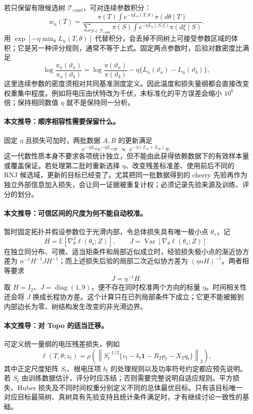 若只保留有限候选树 $\mathcal T_{\mathrm{cand}}$，可对连续参数积分：
\[
 w_n(T)=
 \frac{\pi(T)\int e^{-\eta L_n(T,\theta)}\pi(d\theta\mid T)}
 {\sum_{S\in\mathcal T_{\mathrm{cand}}}\pi(S)
       \int e^{-\eta L_n(S,\xi)}\pi(d\xi\mid S)}.
\]
用 $\exp[-\eta\min_\theta L_n(T,\theta)]$ 代替积分，会丢掉不同树上可接受参数区域的体积；它是另一种评分规则，通常不等于上式。固定两点参数时，后验对数密度比满足
\[
 \log\frac{\pi_n(\vartheta_a)}{\pi_n(\vartheta_b)}
 =\log\frac{\pi(\vartheta_a)}{\pi(\vartheta_b)}
  -\eta\{L_n(\vartheta_a)-L_n(\vartheta_b)\},
\]
这里连续参数的密度须相对共同基准测度定义。因此温度和损失量纲都会直接改变权重集中程度。例如将电压由伏特改为千伏，未标准化的平方误差会缩小 $10^6$ 倍；保持相同数值 $\eta$ 就不是保持同一分析。

\paragraph{本文推导：顺序相容性需要保留什么。}
固定 $\eta$ 且损失可加时，两批数据 $A,B$ 的更新满足
\[
 e^{-\eta L_B}e^{-\eta L_A}\pi
 \ \propto\ e^{-\eta(L_A+L_B)}\pi.
\]
这一代数性质本身不要求各项统计独立，但不能由此获得依赖数据下的有效样本量或覆盖保证。若处理第二批时重新选择 $\eta$、改变残差标准差、使用前后不同的 RNJ 候选域，更新的目标已经变了。尤其把同一批数据得到的 cherry 先验再作为独立外部信息加入损失，会让同一证据被重复计权；必须记录先验来源及训练、评分的划分。

\paragraph{本文推导：可信区间的尺度为何不能自动校准。}
暂时固定拓扑并假设参数位于光滑内部，令总体损失具有唯一极小点 $\theta_\star$，记
\[
 H=\mathbb E[\nabla^2_\theta\ell(\theta_\star;Z)],\qquad
 J=\operatorname{Var}[\nabla_\theta\ell(\theta_\star;Z)].
\]
在独立同分布、可微、适当矩条件和局部近似成立时，经验损失极小点的渐近协方差为
$n^{-1}H^{-1}JH^{-1}$；而上述损失后验的局部二次近似协方差为
$(\eta nH)^{-1}$。两者相等要求
\[
 J=\eta^{-1}H.
\]
取 $H=I_2$、$J=\operatorname{diag}(1,9)$，便不存在同时校准两个方向的标量 $\eta$。时间相关性还会将 $J$ 换成长程协方差。这个计算只在已列局部条件下成立；它更不能被搬到内部边长为零、树结构发生改变的非光滑边界。

\paragraph{本文推导：对 Topo 的适当迁移。}
可定义统一量纲的电压残差损失，例如
\[
 \ell(T,\theta;z_t)
 =\rho\!\left(
 \left\|S_t^{-1/2}\{v_t-b_t\mathbf1-R_Tp_t-X_Tq_t\}\right\|_2
 \right),
\]
其中正定尺度矩阵 $S_t$、根电压项 $b_t$ 的处理规则以及功率符号约定都应预先说明。若 $S_t$ 由训练数据估计，评分时应冻结；否则需要完整说明自适应规则。平方损失、Huber 损失及不同时间权重分别定义不同的总体最优目标。只有该目标唯一对应目标最简树、真树具有先验支持且统计条件满足时，才有继续讨论一致性的基础。

